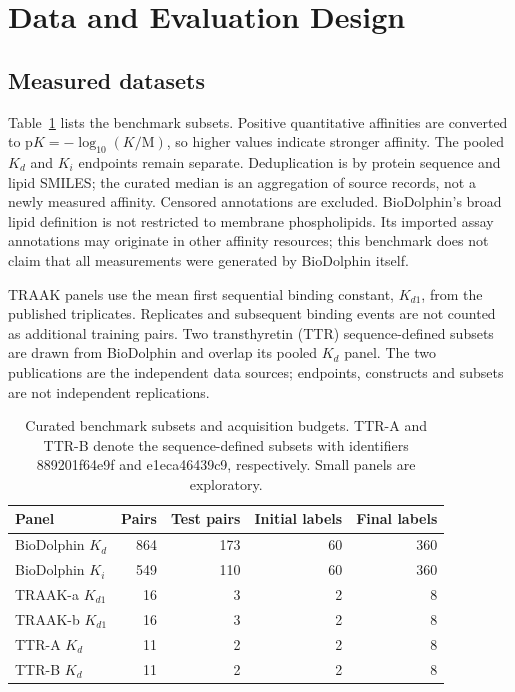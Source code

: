\documentclass[wcp]{jmlr}
\begin{document}
\section{Data and Evaluation Design}
\subsection{Measured datasets}
Table~\ref{tab:data} lists the benchmark subsets. Positive quantitative
affinities are converted to $\mathrm{p}K=-\log_{10}(K/\mathrm{M})$, so higher
values indicate stronger affinity. The pooled $K_d$ and $K_i$ endpoints
remain separate. Deduplication is by protein sequence and lipid SMILES;
the curated median is an aggregation of source records, not a newly measured
affinity. Censored annotations are excluded. BioDolphin's broad lipid
definition is not restricted to membrane phospholipids. Its imported assay
annotations may originate in other affinity resources; this benchmark does
not claim that all measurements were generated by BioDolphin itself.

TRAAK panels use the mean first sequential binding constant, $K_{d1}$,
from the published triplicates. Replicates and subsequent binding events
are not counted as additional training pairs. Two transthyretin (TTR)
sequence-defined subsets are drawn from BioDolphin and overlap its pooled
$K_d$ panel. The two publications are the independent data sources;
endpoints, constructs and subsets are not independent replications.

\begin{table}[t]
\centering
\caption{Curated benchmark subsets and acquisition budgets. TTR-A and TTR-B
denote the sequence-defined subsets with identifiers 889201f64e9f and
e1eca46439c9, respectively. Small panels are exploratory.}
\label{tab:data}
\begin{tabular}{lrrrr}
\toprule
Panel & Pairs & Test pairs & Initial labels & Final labels\\
\midrule
BioDolphin $K_d$ &864&173&60&360\\
BioDolphin $K_i$ &549&110&60&360\\
TRAAK-a $K_{d1}$ &16&3&2&8\\
TRAAK-b $K_{d1}$ &16&3&2&8\\
TTR-A $K_d$ &11&2&2&8\\
TTR-B $K_d$ &11&2&2&8\\
\bottomrule
\end{tabular}
\end{table}
\end{document}
